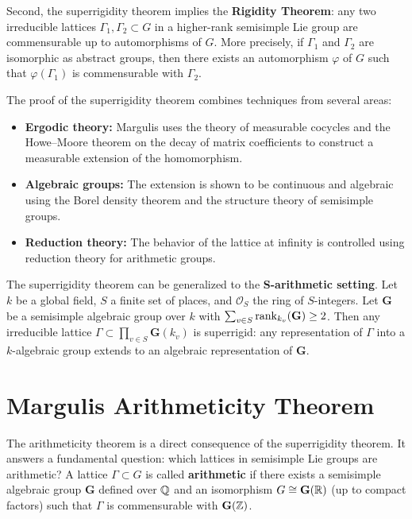 Second, the superrigidity theorem implies the \textbf{Rigidity Theorem}: any two irreducible lattices \(\Gamma_1, \Gamma_2 \subset G\) in a higher-rank semisimple Lie group are commensurable up to automorphisms of \(G\). More precisely, if \(\Gamma_1\) and \(\Gamma_2\) are isomorphic as abstract groups, then there exists an automorphism \(\varphi\) of \(G\) such that \(\varphi(\Gamma_1)\) is commensurable with \(\Gamma_2\).

The proof of the superrigidity theorem combines techniques from several areas:
\begin{itemize}
    \item \textbf{Ergodic theory:} Margulis uses the theory of measurable cocycles and the Howe--Moore theorem on the decay of matrix coefficients to construct a measurable extension of the homomorphism.
    \item \textbf{Algebraic groups:} The extension is shown to be continuous and algebraic using the Borel density theorem and the structure theory of semisimple groups.
    \item \textbf{Reduction theory:} The behavior of the lattice at infinity is controlled using reduction theory for arithmetic groups.
\end{itemize}

The superrigidity theorem can be generalized to the \textbf{S-arithmetic setting}. Let \(k\) be a global field, \(S\) a finite set of places, and \(\mathcal{O}_S\) the ring of \(S\)-integers. Let \(\mathbf{G}\) be a semisimple algebraic group over \(k\) with \(\sum_{v \in S} \rank_{k_v}(\mathbf{G}) \geq 2\). Then any irreducible lattice \(\Gamma \subset \prod_{v \in S} \mathbf{G}(k_v)\) is superrigid: any representation of \(\Gamma\) into a \(k\)-algebraic group extends to an algebraic representation of \(\mathbf{G}\).

\section{Margulis Arithmeticity Theorem}

The arithmeticity theorem is a direct consequence of the superrigidity theorem. It answers a fundamental question: which lattices in semisimple Lie groups are arithmetic? A lattice \(\Gamma \subset G\) is called \textbf{arithmetic} if there exists a semisimple algebraic group \(\mathbf{G}\) defined over \(\mathbb{Q}\) and an isomorphism \(G \cong \mathbf{G}(\mathbb{R})\) (up to compact factors) such that \(\Gamma\) is commensurable with \(\mathbf{G}(\mathbb{Z})\).

